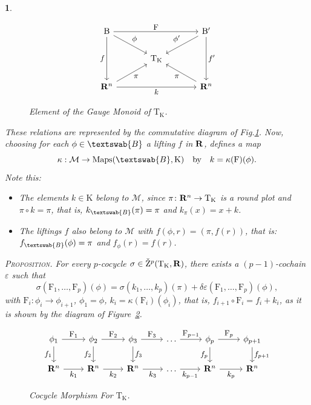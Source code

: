 \documentclass[12pt,reqno]{amsart}
\theoremstyle{article}
\newtheorem{article}{}
\def \B{\mathrm B}
\def \F{\mathrm F}
\def \K{\mathrm K}
\def \T{\mathrm T}
\newcommand{\RR}{{\bf R}}
\newcommand{\cM}{\mathcal{M}}
\newcommand{\fB}{\textswab{B}}
\DeclareMathOperator{\Maps}{Maps}
\newcommand{\vZ}{\check{\mathrm{Z}}}
\let \epsilon=\varepsilon
\begin{document}
\begin{article}
    \begin{figure}[ht]
      \[
      \begin{tikzcd}[column sep=large,every label/.append style = {font = \small}]
        \B \arrow[rr, "\F"] \arrow[dd,swap, "f"] \arrow[dr, "\phi"] &       &  \B' \arrow[dd, "f'"] \arrow[dl, swap, "\phi'"]  \\
        & \T_\K &  \\
        \RR^n \arrow[rr, swap, "k"] \arrow[ur, swap, "\pi"]                  &       &  \RR^n \arrow[ul, "\pi"]
      \end{tikzcd}
      \]
      \vspace{-.5cm}
      \caption{Element of the Gauge Monoid of $\T_\K$.}
      \label{cohomology-of-the-torus}
    \end{figure}
    
    These relations are represented by the commutative diagram of Fig.\ref{cohomology-of-the-torus}.
    Now,
    choosing for each $\phi \in \fB$ a lifting $f$ in $\RR$,
    defines a map
    $$
    \kappa : \cM \to \Maps(\fB,\K) \quad\text{by}\quad k = \kappa(\F)(\phi).
    $$
    Note this:
    
    \begin{itemize}
    \item[--] The elements $k \in \K$ belong to $\cM$,
    since $\pi \colon \RR^n \to \T_\K$ is a round plot and $\pi \circ k = \pi$,
    that is,
    $k_\fB(\pi) = \pi$ and $k_\pi(x) = x+k$.
    \item[--] The liftings $f$ also belong to $\cM$ with $f(\phi,r) = (\pi, f(r))$,
    that is:
    $f_\fB(\phi) = \pi$ and $f_\phi(r) = f(r)$.
    \end{itemize}
    
    \textsc{Proposition.} {\it For every $p$-cocycle $\sigma \in \vZ^p(\T_\K,\RR)$,
    there exists a $(p-1)$-cochain $\epsilon$ such that
    $$
    \sigma(\F_1,\dots,\F_p)(\phi) = \sigma(k_1,\dots,k_p)(\pi) + \delta\epsilon(\F_1,\dots,\F_p)(\phi),
    $$
    with $\F_i \colon \phi_i \to \phi_{i+1}$,
    $\phi_1=\phi$,
    $k_i = \kappa(\F_i)(\phi_i)$,
    that is,
    $f_{i+1} \circ \F_i = f_i + k_i$,
    as it is shown by the diagram of Figure~\ref{Cocycle-Morphism-For-TK}.
    }
    \begin{figure}[ht]
      \[
      \begin{tikzcd}[column sep=normal,every label/.append style = {font = \small}]
        \phi_1 \arrow[r, "\F_1"] \arrow[d,swap, "f_1"] & \phi_2 \arrow[r, "\F_2"] \arrow[d,swap, "f_2"] & \phi_3 \arrow[d, "f_3"] \arrow[r, "\F_3"] & \dots \arrow[r, "\F_{p-1}"] & \phi_p \arrow[d, swap, "f_p"] \arrow[r, "\F_p"] & \phi_{p+1} \arrow[d, "f_{p+1}"] \\
        \RR^n \arrow[r, swap, "k_1"] &  \RR^n \arrow[r, swap, "k_2"] & \RR^n \arrow[r, swap, "k_3"] & \dots \arrow[r,swap, "k_{p-1}"] & \RR^n \arrow[r, swap, "k_p"] & \RR^n
      \end{tikzcd}
      \]
      \vspace{-.5cm}
      \caption{Cocycle Morphism For $\T_\K$.}
      \label{Cocycle-Morphism-For-TK}
    \end{figure}
    

\end{article}
\end{document}
